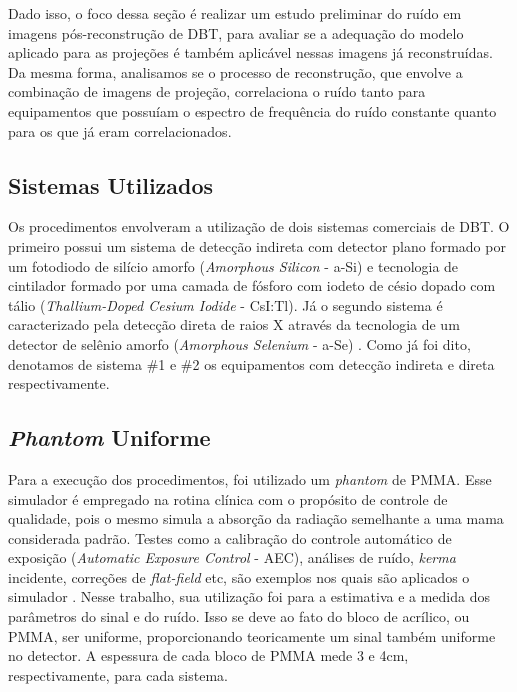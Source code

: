 Dado isso, o foco dessa seção é realizar um estudo preliminar do ruído em imagens pós-reconstrução de \acs{DBT}, para avaliar se a adequação do modelo aplicado para as projeções é também aplicável nessas imagens já reconstruídas. Da mesma forma, analisamos se o processo de reconstrução, que envolve a combinação de imagens de projeção, correlaciona o ruído tanto para equipamentos que possuíam o espectro de frequência do ruído constante quanto para os que já eram correlacionados.   

\subsection{Sistemas Utilizados}

Os procedimentos envolveram a utilização de dois sistemas comerciais de \acs{DBT}. O primeiro possui um sistema de detecção indireta com detector plano formado por um fotodiodo de silício amorfo (\textit{Amorphous Silicon} - \acs{a-Si}) e tecnologia de cintilador formado por uma camada de fósforo com iodeto de césio dopado com tálio (\textit{Thallium-Doped Cesium Iodide} - \acs{CsI:Tl}). Já o segundo sistema é caracterizado pela detecção direta de raios X através da tecnologia de um detector de selênio amorfo (\textit{Amorphous Selenium} - \acs{a-Se}) \cite[p. 531]{mcEntee2017handbook}. Como já foi dito, denotamos de sistema \#1 e \#2 os equipamentos com detecção indireta e direta respectivamente.

\subsection{\textit{Phantom} Uniforme}

Para a execução dos procedimentos, foi utilizado um \textit{phantom} de \ac{PMMA}. Esse simulador é empregado na rotina clínica com o propósito de controle de qualidade, pois o mesmo simula a absorção da radiação semelhante a uma mama considerada padrão. Testes como a calibração do controle automático de exposição (\textit{Automatic Exposure Control} - \acs{AEC}), análises de ruído, \textit{kerma} incidente, correções de \textit{flat-field} etc, são exemplos nos quais são aplicados o simulador \cite{caron2017,vanegen2018protocol}. Nesse trabalho, sua utilização foi para a estimativa e a medida dos parâmetros do sinal e do ruído. Isso se deve ao fato do bloco de acrílico, ou \acs{PMMA}, ser uniforme, proporcionando teoricamente um sinal também uniforme no detector. A espessura de cada bloco de \acs{PMMA} mede 3 e 4cm, respectivamente, para cada sistema.

